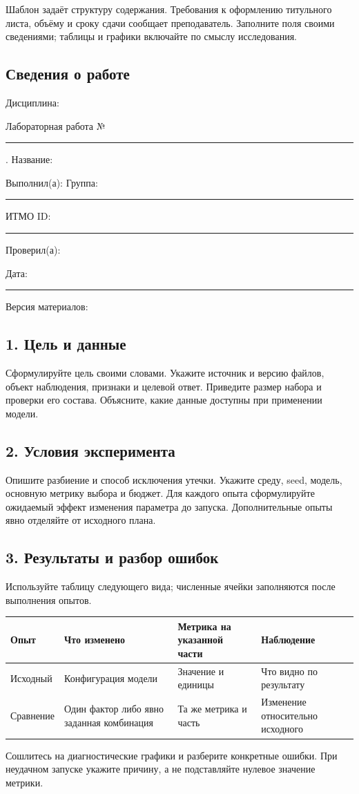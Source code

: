 \label{app:report-template}
Шаблон задаёт структуру содержания. Требования к оформлению титульного листа, объёму и сроку сдачи сообщает преподаватель. Заполните поля своими сведениями; таблицы и графики включайте по смыслу исследования.

\subsection*{Сведения о работе}
\noindent Дисциплина: \hrulefill\par
\noindent Лабораторная работа №\,\rule{8mm}{0.4pt}. Название: \hrulefill\par
\noindent Выполнил(а): \hrulefill\quad Группа: \rule{25mm}{0.4pt}\par
\noindent ИТМО ID: \rule{28mm}{0.4pt}\quad Проверил(а): \hrulefill\par
\noindent Дата: \rule{28mm}{0.4pt}\quad Версия материалов: \hrulefill

\subsection*{1. Цель и данные}
Сформулируйте цель своими словами. Укажите источник и версию файлов, объект наблюдения, признаки и целевой ответ. Приведите размер набора и проверки его состава. Объясните, какие данные доступны при применении модели.

\subsection*{2. Условия эксперимента}
Опишите разбиение и способ исключения утечки. Укажите среду, seed, модель, основную метрику выбора и бюджет. Для каждого опыта сформулируйте ожидаемый эффект изменения параметра до запуска. Дополнительные опыты явно отделяйте от исходного плана.

\subsection*{3. Результаты и разбор ошибок}
Используйте таблицу следующего вида; численные ячейки заполняются после выполнения опытов.
\begin{center}\small
\begin{tabularx}{\textwidth}{@{}p{}Y Y Y@{}}
\toprule
Опыт & Что изменено & Метрика на указанной части & Наблюдение \\
\midrule
Исходный & Конфигурация модели & Значение и единицы & Что видно по результату \\
Сравнение & Один фактор либо явно заданная комбинация & Та же метрика и часть & Изменение относительно исходного \\
\bottomrule
\end{tabularx}
\end{center}
Сошлитесь на диагностические графики и разберите конкретные ошибки. При неудачном запуске укажите причину, а не подставляйте нулевое значение метрики.

